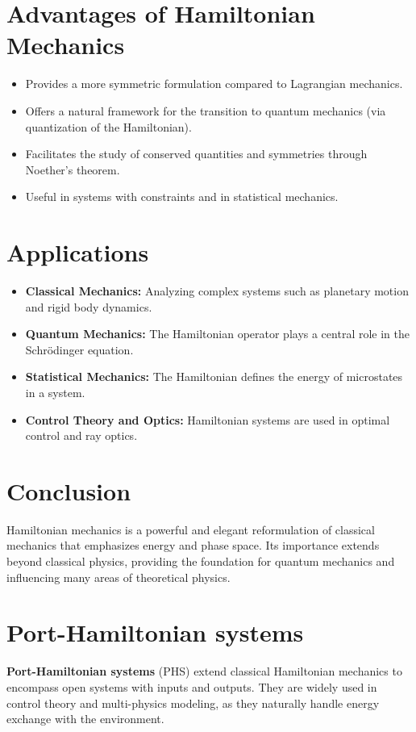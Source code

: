 \section{Advantages of Hamiltonian Mechanics}
\begin{itemize}
    \item Provides a more symmetric formulation compared to Lagrangian mechanics.
    \item Offers a natural framework for the transition to quantum mechanics (via quantization of the Hamiltonian).
    \item Facilitates the study of conserved quantities and symmetries through Noether's theorem.
    \item Useful in systems with constraints and in statistical mechanics.
\end{itemize}

\section{Applications}
\begin{itemize}
    \item \textbf{Classical Mechanics:} Analyzing complex systems such as planetary motion and rigid body dynamics.
    \item \textbf{Quantum Mechanics:} The Hamiltonian operator plays a central role in the Schrödinger equation.
    \item \textbf{Statistical Mechanics:} The Hamiltonian defines the energy of microstates in a system.
    \item \textbf{Control Theory and Optics:} Hamiltonian systems are used in optimal control and ray optics.
\end{itemize}

\section{Conclusion}
Hamiltonian mechanics is a powerful and elegant reformulation of classical mechanics that emphasizes energy and phase space. Its importance extends beyond classical physics, providing the foundation for quantum mechanics and influencing many areas of theoretical physics.



\section{Port-Hamiltonian systems}
\textbf{Port-Hamiltonian systems} (PHS) extend classical Hamiltonian mechanics to encompass open systems with inputs and outputs. They are widely used in control theory and multi-physics modeling, as they naturally handle energy exchange with the environment.

